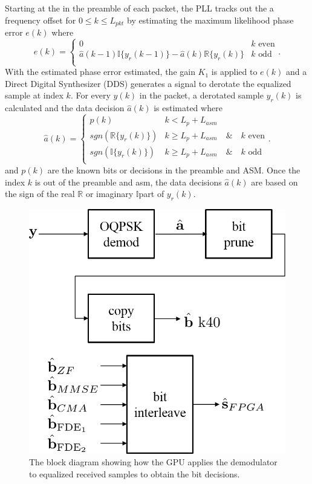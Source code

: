 Starting at the in the preamble of each packet, the PLL tracks out the a frequency offset for $0\leq k \leq L_{pkt}$ by estimating the maximum likelihood phase error $e(k)$ where
\begin{equation*}
e(k)
= 
\begin{cases}
0 &\text{$k$ even} \\
\hat{a}(k-1)\mathbb{I}\{y_r(k-1)\} -  \hat{a}(k)\mathbb{R}\{y_r(k)\}  &\text{$k$ odd}\\
\end{cases}.
\end{equation*}
With the estimated phase error estimated, the gain $K_1$ is applied to $e(k)$ and a Direct Digital Synthesizer (DDS) generates a signal to derotate the equalized sample at index $k$.
For every $y(k)$ in the packet, a derotated sample $y_r(k)$ is calculated and the data decision $\hat{a}(k)$ is estimated where
\begin{equation}
\hat{a}(k)= \begin{cases}
p(k) &k<L_p+L_{asm} \\
sgn(\mathbb{R}\{y_{r}(k)\})&k\geq L_p+L_{asm} \quad \& \quad \text{$k$ even}\\
sgn(\mathbb{I}\{y_{r}(k)\})&k\geq L_p+L_{asm} \quad \& \quad \text{$k$ odd}\\
\end{cases}.
\end{equation}
and $p(k)$ are the known bits or decisions in the preamble and ASM.
Once the index $k$ is out of the preamble and asm, the data decisions $\hat{a}(k)$ are based on the sign of the real $\mathbb{R}$ or imaginary $\mathbb{I}$part of $y_r(k)$. 
\begin{figure}
	\centering\includegraphics[width=\textwidth/10*5]{figures/gpu/demod_block.png}
	\caption{The block diagram showing how the GPU applies the demodulator to equalized received samples to obtain the bit decisions.}
	\label{fig:demod_block}
\end{figure}
